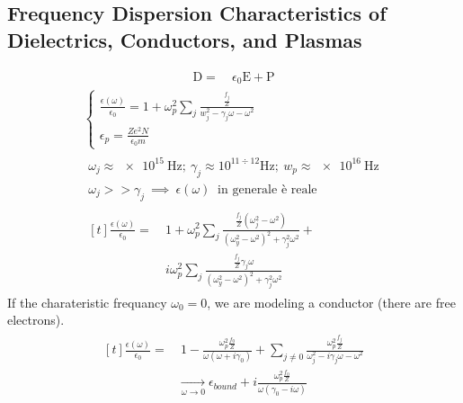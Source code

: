 \documentclass[a4paper, twocolumn]{article}
\begin{document}
\subsection{Frequency Dispersion Characteristics of Dielectrics,
Conductors, and Plasmas}
\begin{equation}
  \begin{split}
    \mathrm{D}=&~\epsilon_0 \mathrm{E} + \mathrm{P} %
  \end{split}
\end{equation}
\begin{gather}
  \begin{cases}
    \frac{\epsilon(\omega)}{\epsilon_0} =1 + \omega_p ^2 \sum_j \frac{\frac{f_j}{Z}}{w_j^2 - \gamma_j \omega - \omega^2} \\
    \epsilon_p=\frac{Z e^2 N}{\epsilon_0 m}
  \end{cases}\\
  \begin{split}
    \omega_j\approx \SI{e15}{\hertz};~ \gamma_j\approx 10^{11\div 12}\si{\hertz};~ w_p\approx \SI{e16}{\hertz}\\
    \text{$\omega_j>>\gamma_j~\implies~\epsilon(\omega)~$ in generale è reale}
  \end{split}\\  
  \begin{aligned}[t]
    \frac{\epsilon(\omega)}{\epsilon_0} =&~1 + \omega_p ^2\sum_j \frac{\frac{f_j}{Z}(\omega_j^2-\omega^2)}{(\omega_y^2-\omega^2)^2+\gamma^2_j\omega^2}+\\
    &~i\omega_p^2\sum_j \frac{\frac{f_j}{Z}\gamma_j\omega}{(\omega_y^2-\omega^2)^2+\gamma^2_j\omega^2}
  \end{aligned}
\end{gather}
If the charateristic frequancy $\omega_0=0$, we are modeling a conductor (there are free electrons).
\begin{align}
  \label{eq:48}
  \begin{aligned}[t]
    \frac{\epsilon(\omega)}{\epsilon_0}=&~1-\frac{\omega_p^2 \frac{f_0}{Z}}{\omega(\omega+i\gamma_0)}+\sum_{j\neq0}\frac{\omega_p^2 \frac{f_j}{Z}}{\omega_j^2-i\gamma_j\omega-\omega^2} \\
    &\xrightarrow[\omega\to0]{}\epsilon_{bound}+i \frac{\omega_p^2 \frac{f_0}{Z}}{\omega(\gamma_0-i\omega)}
\end{aligned}
\end{align}
\end{document}

